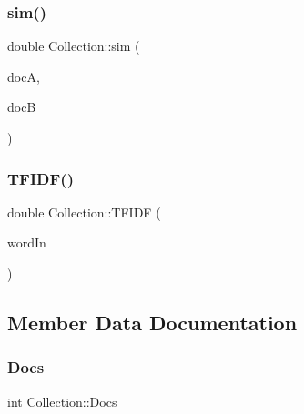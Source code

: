 \mbox{\label{class_collection_a3fde023d06ce5f5b14a3f3ab084bd7dd}} 
\subsubsection{\texorpdfstring{sim()}{sim()}}
{\footnotesize\ttfamily double Collection\+::sim (\begin{DoxyParamCaption}\item[{\hyperlink{class_word_counts}{Word\+Counts} \&}]{docA,  }\item[{\hyperlink{class_word_counts}{Word\+Counts} \&}]{docB }\end{DoxyParamCaption})}

\mbox{\label{class_collection_a97bcf6c668c2bb836baf245fcc3abdc2}} 
\subsubsection{\texorpdfstring{T\+F\+I\+D\+F()}{TFIDF()}}
{\footnotesize\ttfamily double Collection\+::\+T\+F\+I\+DF (\begin{DoxyParamCaption}\item[{\hyperlink{class_word}{Word} \&}]{word\+In }\end{DoxyParamCaption})}



\subsection{Member Data Documentation}
\mbox{\label{class_collection_a4fba917ef63c2afab571d6d633900451}} 
\subsubsection{\texorpdfstring{Docs}{Docs}}
{\footnotesize\ttfamily int Collection\+::\+Docs\hspace{0.3cm}{\ttfamily [protected]}}

\mbox{\label{class_collection_a6c88fe997e89b4c063face18eda3906a}} 
